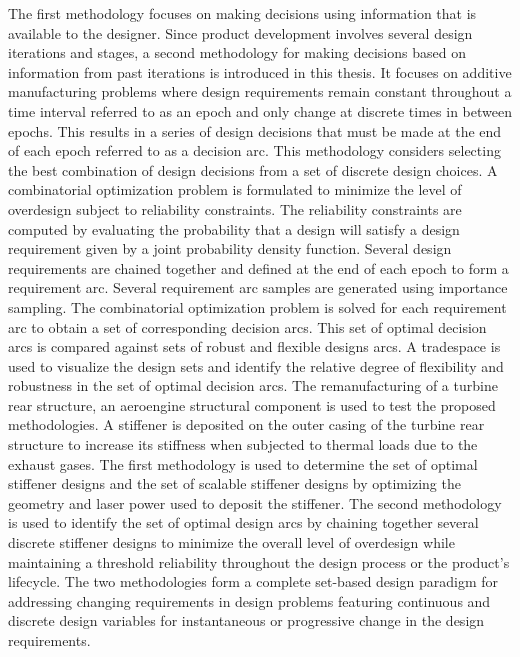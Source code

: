 \documentclass[12pt,Bold,letterpaper,TexShade,twoside]{mcgilletdclass}
\begin{document}
\begin{romanPagenumber}{2}
{The first methodology focuses on making decisions using information that is available to the designer. Since product development involves several design iterations and stages, a second methodology for making decisions based on information from past iterations is introduced in this thesis. It focuses on additive manufacturing problems where design requirements remain constant throughout a time interval referred to as an epoch and only change at discrete times in between epochs. This results in a series of design decisions that must be made at the end of each epoch referred to as a decision arc. This methodology considers selecting the best combination of design decisions from a set of discrete design choices. A combinatorial optimization problem is formulated to minimize the level of overdesign subject to reliability constraints. The reliability constraints are computed by evaluating the probability that a design will satisfy a design requirement given by a joint probability density function. Several design requirements are chained together and defined at the end of each epoch to form a requirement arc. Several requirement arc samples are generated using importance sampling. The combinatorial optimization problem is solved for each requirement arc to obtain a set of corresponding decision arcs. This set of optimal decision arcs is compared against sets of robust and flexible designs arcs. A tradespace is used to visualize the design sets and identify the relative degree of flexibility and robustness in the set of optimal decision arcs.
The remanufacturing of a turbine rear structure, an aeroengine structural component is used to test the proposed methodologies. A stiffener is deposited on the outer casing of the turbine rear structure to increase its stiffness when subjected to thermal loads due to the exhaust gases. The first methodology is used to determine the set of optimal stiffener designs and the set of scalable stiffener designs by optimizing the geometry and laser power used to deposit the stiffener. The second methodology is used to identify the set of optimal design arcs by chaining together several discrete stiffener designs to minimize the overall level of overdesign while maintaining a threshold reliability throughout the design process or the product’s lifecycle.
The two methodologies form a complete set-based design paradigm for addressing changing requirements in design problems featuring continuous and discrete design variables for instantaneous or progressive change in the design requirements.}
\AbstractEn%


\end{romanPagenumber}
\end{document}
